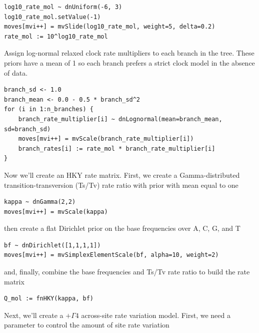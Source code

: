 \begin{snugshade}
\begin{lstlisting}
log10_rate_mol ~ dnUniform(-6, 3)
log10_rate_mol.setValue(-1)
moves[mvi++] = mvSlide(log10_rate_mol, weight=5, delta=0.2)
rate_mol := 10^log10_rate_mol
\end{lstlisting}
\end{snugshade}

Assign log-normal relaxed clock rate multipliers to each branch in the tree.
These priors have a mean of 1 so each branch prefers a strict clock model in the absence of data.
\begin{snugshade}
\begin{lstlisting}
branch_sd <- 1.0
branch_mean <- 0.0 - 0.5 * branch_sd^2
for (i in 1:n_branches) {
    branch_rate_multiplier[i] ~ dnLognormal(mean=branch_mean, sd=branch_sd)
    moves[mvi++] = mvScale(branch_rate_multiplier[i])
    branch_rates[i] := rate_mol * branch_rate_multiplier[i]
}
\end{lstlisting}
\end{snugshade}

Now we'll create an HKY rate matrix.
First, we create a Gamma-distributed transition-transversion (Ts/Tv) rate ratio with prior with mean equal to one

\begin{snugshade}
\begin{lstlisting}
kappa ~ dnGamma(2,2)
moves[mvi++] = mvScale(kappa)
\end{lstlisting}
\end{snugshade}

then create a flat Dirichlet prior on the base frequencies over A, C, G, and T

\begin{snugshade}
\begin{lstlisting}
bf ~ dnDirichlet([1,1,1,1])
moves[mvi++] = mvSimplexElementScale(bf, alpha=10, weight=2)
\end{lstlisting}
\end{snugshade}

and, finally, combine the base frequencies and Ts/Tv rate ratio to build the rate matrix

\begin{snugshade}
\begin{lstlisting}
Q_mol := fnHKY(kappa, bf)
\end{lstlisting}
\end{snugshade}

Next, we'll create a $+\Gamma4$ across-site rate variation model.
First, we need a parameter to control the amount of site rate variation

